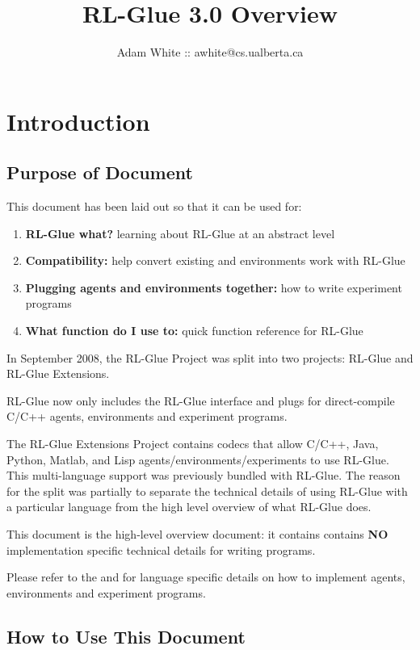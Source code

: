\documentclass[11pt]{article}
\title{RL-Glue 3.0 Overview}
\author{Adam White :: awhite@cs.ualberta.ca}
\date{}
\begin{document}
\maketitle
\tableofcontents


\section{Introduction}
\subsection{Purpose of Document}
This document has been laid out so that it can be used for: 
\begin{enumerate}
\item  {\bf RL-Glue what?} learning about RL-Glue at an abstract level
\item {\bf Compatibility:} help convert existing and environments work with RL-Glue
\item {\bf Plugging agents and environments together:} how to write experiment programs
\item{\bf What function do I use to:} quick function reference for RL-Glue
\end{enumerate}

In September 2008, the RL-Glue Project was split into two projects: RL-Glue and RL-Glue Extensions.

RL-Glue now only includes the RL-Glue interface and plugs for direct-compile C/C++ agents, environments and experiment programs.

The RL-Glue Extensions Project contains codecs that allow C/C++, Java, Python, Matlab, and Lisp agents/environments/experiments to use RL-Glue.  This multi-language support was previously bundled with RL-Glue.  The reason for the split was partially to separate the technical details of using RL-Glue with a particular language from the high level overview of what RL-Glue does.

This document is the high-level overview document: it contains contains {\bf NO} implementation specific technical details for writing programs.

Please refer to the  and  for language specific details on how to implement agents, environments and experiment programs.
 
\subsection{How to Use This Document}
\end{document}
